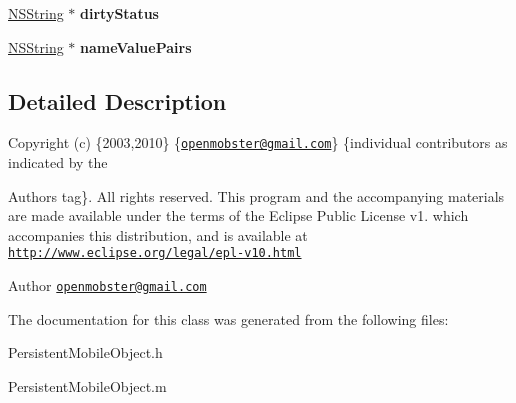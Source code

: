 \begin{DoxyCompactItemize}
\item 
\hypertarget{interface_persistent_mobile_object_a6db24dda0c235dc2fd0a0cda855203e1}{
\hyperlink{class_n_s_string}{\-N\-S\-String} $\ast$ {\bfseries dirty\-Status}}
\label{interface_persistent_mobile_object_a6db24dda0c235dc2fd0a0cda855203e1}

\item 
\hypertarget{interface_persistent_mobile_object_afdc8d7311db83999ec7c68a62eeda85f}{
\hyperlink{class_n_s_string}{\-N\-S\-String} $\ast$ {\bfseries name\-Value\-Pairs}}
\label{interface_persistent_mobile_object_afdc8d7311db83999ec7c68a62eeda85f}

\end{DoxyCompactItemize}


\subsection{\-Detailed \-Description}
\-Copyright (c) \{2003,2010\} \{\href{mailto:openmobster@gmail.com}{\tt openmobster@gmail.\-com}\} \{individual contributors as indicated by the \begin{DoxyAuthor}{\-Authors}
tag\}. \-All rights reserved. \-This program and the accompanying materials are made available under the terms of the \-Eclipse \-Public \-License v1. which accompanies this distribution, and is available at \href{http://www.eclipse.org/legal/epl-v10.html}{\tt http\-://www.\-eclipse.\-org/legal/epl-\/v10.\-html}
\end{DoxyAuthor}
\begin{DoxyAuthor}{\-Author}
\href{mailto:openmobster@gmail.com}{\tt openmobster@gmail.\-com} 
\end{DoxyAuthor}


\-The documentation for this class was generated from the following files\-:\begin{DoxyCompactItemize}
\item 
\-Persistent\-Mobile\-Object.\-h\item 
\-Persistent\-Mobile\-Object.\-m\end{DoxyCompactItemize}
